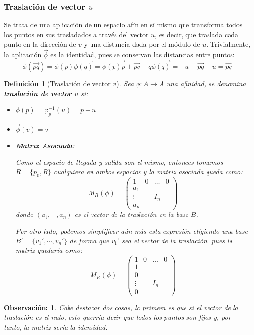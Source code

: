 \documentclass[10pt,a4paper,openright]{book}
\theoremstyle{break}
\newtheorem*{defi}{Definición}
\newtheorem*{obs}{\underline{Observación}:}
\begin{document}
\subsubsection{Traslación de vector $u$}
Se trata de una aplicación de un espacio afín en sí mismo que transforma todos los puntos en sus trasladados a través del vector $u$, es decir, que traslada cada punto en la dirección de $v$ y una distancia dada por el módulo de $u$. Trivialmente, la aplicación $\vec{\phi}$ es la identidad, pues se conservan las distancias entre puntos:
$$\phi(\vec{pq}) = \overrightarrow{\phi(p)\phi(q)} = \overrightarrow{\phi(p)p} + \vec{pq} + \overrightarrow{q\phi(q)} = - u + \vec{pq} + u= \vec{pq}$$
\begin{defi}[Traslación de vector $u$]
Sea $\phi: A \rightarrow A$ una afinidad, se denomina \textbf{traslación de vector $u$} si:
\begin{itemize}
\item $\phi(p) = \varphi_p^{-1}(u) = p + u$
\item $\vec{\phi}(v) = v$
\item \underline{\textbf{Matriz Asociada}}:

Como el espacio de llegada y salida son el mismo, entonces tomamos $R = \{p_0, B\} $ cualquiera en ambos espacios y la matriz asociada queda como:
$$M_{R} (\phi) = \left(\begin{array}{c|ccc}
1  & 0 & \ldots & 0 \\
\hline
a_1  &  & & \\
\vdots &  & I_n & \\
a_n & & &
\end{array}
\right)$$
donde $(a_1, \cdots, a_n)$ es el vector de la traslación en la base $B$.

Por otro lado, podemos simplificar aún más esta expresión eligiendo una base $B'=\{v_1', \cdots, v_n'\}$ de forma que $v_1'$ sea el vector de la traslación, pues la matriz quedaría como:
$$M_{R} (\phi) = \left(\begin{array}{c|ccc}
1  & 0 & \ldots & 0 \\
\hline
1  &  & & \\
0 & & & \\
\vdots &  & I_n & \\
0 & & &
\end{array}
\right)$$
\end{itemize}
\end{defi}

\begin{obs}
Cabe destacar dos cosas, la primera es que si el vector de la traslación es el nulo, esto querría decir que todos los puntos son fijos y, por tanto, la matriz sería la identidad.
\end{obs}
\end{document}
